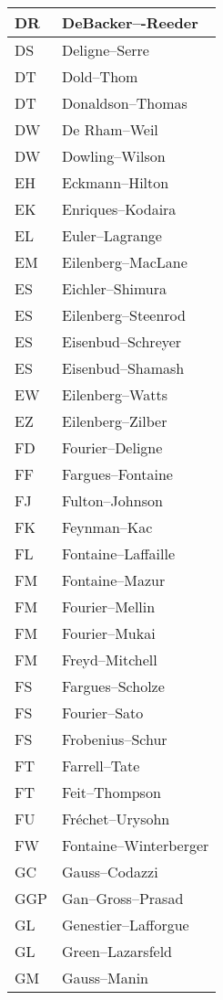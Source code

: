 \documentclass{amsart}
\numberwithin{equation}{section}
\theoremstyle{plain}
\numberwithin{equation}{section}
\theoremstyle{remark}
\begin{document}
\begin{multicols}{2}
{\begin{longtable}{l|l}
DR & DeBacker–-Reeder\\ \hline
DS & Deligne--Serre \\ \hline
DT & Dold--Thom\\ \hline
DT & Donaldson--Thomas\\ \hline
DW & De Rham--Weil\\ \hline
DW & Dowling--Wilson\\ \hline
EH & Eckmann--Hilton\\ \hline
EK & Enriques--Kodaira\\ \hline
EL & Euler--Lagrange\\ \hline
EM & Eilenberg--MacLane\\ \hline
ES & Eichler--Shimura\\ \hline
ES & Eilenberg--Steenrod\\ \hline
ES & Eisenbud--Schreyer\\ \hline
ES & Eisenbud--Shamash\\ \hline
EW & Eilenberg--Watts\\ \hline
EZ & Eilenberg--Zilber\\ \hline
FD & Fourier--Deligne\\ \hline
FF & Fargues--Fontaine\\ \hline
FJ & Fulton--Johnson\\ \hline
FK & Feynman--Kac\\ \hline
FL & Fontaine--Laffaille\\ \hline
FM & Fontaine--Mazur\\ \hline
FM & Fourier--Mellin\\ \hline
FM & Fourier--Mukai\\ \hline
FM & Freyd--Mitchell\\ \hline
FS & Fargues--Scholze\\ \hline
FS & Fourier--Sato\\ \hline
FS & Frobenius--Schur\\ \hline
FT & Farrell--Tate\\ \hline
FT & Feit--Thompson\\ \hline
FU & Fréchet--Urysohn\\ \hline
FW & Fontaine--Winterberger\\ \hline
GC & Gauss--Codazzi\\ \hline
GGP & Gan--Gross--Prasad\\ \hline
GL & Genestier--Lafforgue\\ \hline
GL & Green--Lazarsfeld\\ \hline
GM & Gauss--Manin\\ \hline

\end{longtable}}
\end{multicols}
\end{document}
